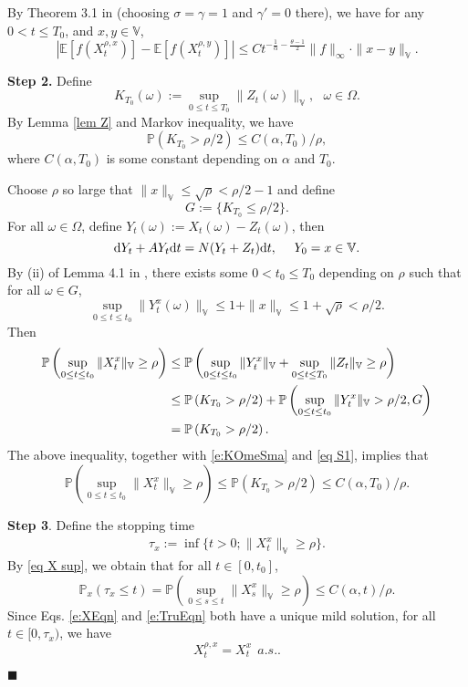 \documentclass[12pt,a4paper]{article}
\theoremstyle{definition}
\theoremstyle{remark}
\numberwithin{equation}{section}
\newcommand{\E}{\mathbb{E}}            %
\newcommand{\VV}{\mathbb{V}}
\newcommand{\PP}{\mathbb{P}}
\newcommand{\beq}{\begin{equation}}
\newcommand{\nneq}{\end{equation}}
\newcommand{\dif}{{\rm d}}
\newenvironment{proof}{\par\noindent{\bf Proof:}}{\hspace*{\fill}$\blacksquare$\par}
\begin{document}
{\begin{proof}
 By Theorem 3.1 in \cite{DXZ14JSP} (choosing $\sigma=\gamma=1$ and $\gamma'=0$ there), we have for any $0<t\le T_0$, and  $x,y\in \VV$,
 \beq\label{eq DXZ lem 3.1}
 |\E[f(X^{\rho,x}_t)]-\E[f(X^{\rho,y}_t)]| \le   Ct^{-\frac{1}{\alpha}-\frac{\theta-1}{2}} \|f\|_{\infty}\cdot \|x-y\|_{\VV}.
 \nneq

\vskip 0.3cm




{\bf Step 2.} Define
$$K_{T_0}(\omega):= \sup_{0 \le t \le T_0}\|Z_t(\omega)\|_{\VV}, \ \ \ \omega \in \Omega.$$
By Lemma \ref{lem Z} and Markov inequality, we have
\beq \label{e:KOmeSma}
\PP(K_{T_0}>\rho/2) \le   C(\alpha, T_0)/{\rho},
\nneq
where $C(\alpha, T_0)$ is some constant depending on $\alpha$ and $T_0$.

Choose $\rho$ so large that $\|x\|_{\VV}\le \sqrt \rho<  \rho/2-1$ and define
$$G:=\{K_{T_0}\le \rho/2\}.$$
For all $\omega \in \Omega$, define $Y_t(\omega):= X_t(\omega)-Z_t(\omega)$, then
 \begin{equation*}
\dif Y_t+A Y_t\dif t=N(Y_t+Z_t)\dif t, \ \ \ \ Y_0=x\in \VV.
 \end{equation*}
By (ii) of Lemma 4.1 in \cite{Xu13}, there exists some
$0<t_0 \le T_0$ depending on $\rho$ such that for all
$\omega \in G$,
$$
\sup_{0 \le t \le t_0} \|Y^x_t(\omega)\|_{\VV} \le 1+\|x\|_{\VV}  \le 1+\sqrt \rho<\rho/2.
$$
Then
\begin{align}\label{eq S1}
 \PP\left(\sup_{0 \le t \le t_0} \|X^x_t\|_{\VV} \ge \rho\right) &\le \PP\left(\sup_{0 \le t \le t_0} \|Y^x_t\|_{\VV}
+\sup_{0 \le t \le T_0} \|Z_t\|_{\VV} \ge \rho\right)  \notag \\
& \le \PP\left(K_{T_0}>\rho/2\right)+\PP\left(\sup_{0 \le t \le t_0} \|Y^x_t\|_{\VV}>\rho/2, G\right)\notag\\
& = \PP\left(K_{T_0}>\rho/2\right).
\end{align}
The above inequality,  together with   \eqref{e:KOmeSma} and \eqref{eq S1},  implies that
\beq\label{eq X sup}
\PP\left(\sup_{0 \le t \le t_0} \|X^x_t\|_{\VV} \ge \rho\right) \le \PP(K_{T_0}>\rho/2)\le C(\alpha, T_0)/\rho.
\nneq

\vskip0.3cm
{\bf Step 3}.
Define the stopping time
 \begin{align*}\label{stopping time}
 \tau_x:=\inf\{t>0; \|X_t^x\|_{\VV}\ge \rho \}.
 \end{align*}
By \eqref{eq X sup}, we obtain that for all $t \in [0,t_0]$,
\beq \label{e:TauEst}
\PP_x(\tau_{x} \le t)=\PP\left(\sup_{0 \le s \le t} \|X^x_s\|_{\VV} \ge \rho\right) \le  C(\alpha, t)/\rho.
\nneq
Since Eqs. \eqref{e:XEqn} and   \eqref{e:TruEqn} both have a unique mild solution, for all $t \in [0, \tau_{x})$,
we have
\beq \label{e:StrWeaUni}
X^{\rho,x}_t=X^x_t \ \ a.s..
\nneq




\end{proof}}
\end{document}
